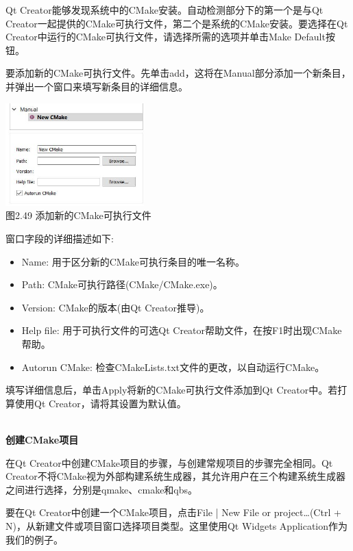 Qt Creator能够发现系统中的CMake安装。自动检测部分下的第一个是与Qt Creator一起提供的CMake可执行文件，第二个是系统的CMake安装。要选择在Qt Creator中运行的CMake可执行文件，请选择所需的选项并单击Make Default按钮。

要添加新的CMake可执行文件。先单击add，这将在Manual部分添加一个新条目，并弹出一个窗口来填写新条目的详细信息。

\begin{center}
\includegraphics[width=0.4\textwidth]{content/1/chapter2/images/49.jpg}\\
图2.49 添加新的CMake可执行文件
\end{center}

窗口字段的详细描述如下:

\begin{itemize}
\item 
Name: 用于区分新的CMake可执行条目的唯一名称。

\item 
Path: CMake可执行路径(CMake/CMake.exe)。

\item 
Version: CMake的版本(由Qt Creator推导)。

\item 
Help file: 用于可执行文件的可选Qt Creator帮助文件，在按F1时出现CMake帮助。

\item 
Autorun CMake: 检查CMakeLists.txt文件的更改，以自动运行CMake。
\end{itemize}

填写详细信息后，单击Apply将新的CMake可执行文件添加到Qt Creator中。若打算使用Qt Creator，请将其设置为默认值。

\hspace*{\fill} \\ %
\noindent
\textbf{创建CMake项目}

在Qt Creator中创建CMake项目的步骤，与创建常规项目的步骤完全相同。Qt Creator不将CMake视为外部构建系统生成器，其允许用户在三个构建系统生成器之间进行选择，分别是qmake、cmake和qbs。

要在Qt Creator中创建一个CMake项目，点击File | New File or project…(Ctrl + N)，从新建文件或项目窗口选择项目类型。这里使用Qt Widgets Application作为我们的例子。

